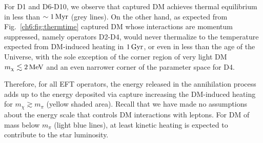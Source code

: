 For D1 and D6-D10, we observe that captured DM achieves thermal equilibrium in less than $\sim 1{\rm \,Myr}$ (grey lines). 
On the other hand, as expected from Fig.~\ref{ch6:fig:thermtime} captured DM whose interactions are momentum suppressed, namely operators D2-D4, would never thermalize to the temperature expected from DM-induced heating in $1{\rm \,Gyr}$, or even in less than the age of the 
Universe,
with the sole exception of the corner region of very light DM $m_\chi\lesssim 2{\rm \,MeV}$ and an even narrower corner of the parameter space for D4. 

Therefore, for all EFT operators,  the energy released in the annihilation process adds up to the energy deposited via capture increasing the DM-induced heating  
for $m_\chi\gtrsim m_\pi$ (yellow shaded area). 
Recall that we have made no assumptions about the energy scale that controls DM interactions with leptons. 
For DM of mass below $m_\pi$ (light blue lines), at least kinetic heating is expected to contribute to the star luminosity.  

  
